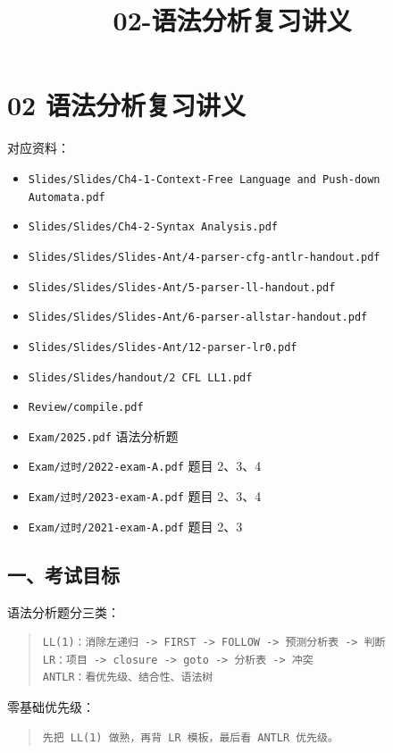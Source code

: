 \documentclass[UTF8,zihao=-4]{ctexart}
\title{02-语法分析复习讲义}
\author{}
\date{}
\begin{document}
\maketitle
\setcounter{tocdepth}{1}
\tableofcontents
\newpage
\section{02 语法分析复习讲义}


对应资料：


\begin{itemize}
\item \texttt{Slides/Slides/Ch4-1-Context-Free Language and Push-down Automata.pdf}
\item \texttt{Slides/Slides/Ch4-2-Syntax Analysis.pdf}
\item \texttt{Slides/Slides/Slides-Ant/4-parser-cfg-antlr-handout.pdf}
\item \texttt{Slides/Slides/Slides-Ant/5-parser-ll-handout.pdf}
\item \texttt{Slides/Slides/Slides-Ant/6-parser-allstar-handout.pdf}
\item \texttt{Slides/Slides/Slides-Ant/12-parser-lr0.pdf}
\item \texttt{Slides/Slides/handout/2 CFL LL1.pdf}
\item \texttt{Review/compile.pdf}
\item \texttt{Exam/2025.pdf} 语法分析题
\item \texttt{Exam/过时/2022-exam-A.pdf} 题目 2、3、4
\item \texttt{Exam/过时/2023-exam-A.pdf} 题目 2、3、4
\item \texttt{Exam/过时/2021-exam-A.pdf} 题目 2、3
\end{itemize}


\subsection{一、考试目标}


语法分析题分三类：


\begin{quote}
\footnotesize
\begin{verbatim}
LL(1)：消除左递归 -> FIRST -> FOLLOW -> 预测分析表 -> 判断
LR：项目 -> closure -> goto -> 分析表 -> 冲突
ANTLR：看优先级、结合性、语法树
\end{verbatim}
\end{quote}


零基础优先级：


\begin{quote}
\footnotesize
\begin{verbatim}
先把 LL(1) 做熟，再背 LR 模板，最后看 ANTLR 优先级。
\end{verbatim}
\end{quote}
\end{document}
